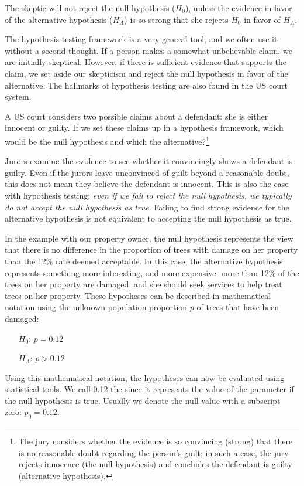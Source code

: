 \begin{tipBox}{
The skeptic will not reject the null hypothesis ($H_0$), unless the evidence in favor of the alternative hypothesis ($H_A$) is so strong that she rejects $H_0$ in favor of $H_A$.}
\end{tipBox}

The hypothesis testing framework is a very general tool, and we often use it without a second thought. If a person makes a somewhat unbelievable claim, we are initially skeptical. However, if there is sufficient evidence that supports the claim, we set aside our skepticism and reject the null hypothesis in favor of the alternative. The hallmarks of hypothesis testing are also found in the US court system.

\begin{exercise} \label{hypTestCourtExample}
A US court considers two possible claims about a defendant: she is either innocent or guilty. If we set these claims up in a hypothesis framework, which would be the null hypothesis and which the alternative?\footnote{The jury considers whether the evidence is so convincing (strong) that there is no reasonable doubt regarding the person's guilt; in such a case, the jury rejects innocence (the null hypothesis) and concludes the defendant is guilty (alternative hypothesis).}
\end{exercise}

Jurors examine the evidence to see whether it convincingly shows a defendant is guilty. Even if the jurors leave unconvinced of guilt beyond a reasonable doubt, this does not mean they believe the defendant is innocent. This is also the case with hypothesis testing: \emph{even if we fail to reject the null hypothesis, we typically do not accept the null hypothesis as true}. Failing to find strong evidence for the alternative hypothesis is not equivalent to accepting the null hypothesis as true.

In the example with our property owner, the null hypothesis represents the view that there is no difference in the proportion of trees with damage on her property than the 12\% rate deemed acceptable. In this case, the alternative hypothesis represents something more interesting, and more expensive: more than 12\% of the trees on her property are damaged, and she should seek services to help treat trees on her property. These hypotheses can be described in mathematical notation using the unknown population proportion $p$ of trees that have been damaged:
\begin{itemize}
\setlength{\itemsep}{0mm}
\item[$H_0$:] $p = 0.12$
\item[$H_A$:] $p > 0.12$
\end{itemize}
Using this mathematical notation, the hypotheses can now be evaluated using statistical tools. We call 0.12 the  since it represents the value of the parameter if the null hypothesis is true. Usually we denote the null value with a subscript zero: $p_0 = 0.12$.



